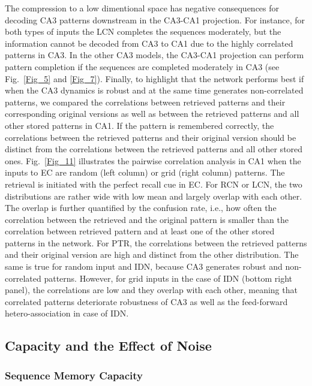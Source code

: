 \documentclass[utf8]{frontiersSCNS} %
\begin{document}
The compression to a low dimentional space has negative consequences for decoding CA3 patterns downstream in the CA3-CA1 projection. For instance, for both types of inputs the LCN completes the sequences moderately, but the information cannot be decoded from CA3 to CA1 due to the highly correlated patterns in CA3. In the other CA3 models, the CA3-CA1 projection can perform pattern completion if the sequences are completed moderately in CA3 (see Fig.~\ref{Fig_5} and \ref{Fig_7}). Finally, to highlight that the network performs best if when the CA3 dynamics is robust and at the same time generates non-correlated patterns, we compared the correlations between retrieved patterns and their corresponding original versions as well as between the retrieved patterns and all other stored patterns in CA1. If the pattern is remembered correctly, the correlations between the retrieved patterns and their original version should be distinct from the correlations between the retrieved patterns and all other stored ones. Fig.~\ref{Fig_11} illustrates the pairwise correlation analysis in CA1 when the inputs to EC are random (left column) or grid (right column) patterns. The retrieval is initiated with the perfect recall cue in EC. For RCN or LCN, the two distributions are rather wide with low mean and largely overlap with each other. The overlap is further quantified by the confusion rate, i.e., how often the correlation between the retrieved and the original pattern is smaller than the correlation between retrieved pattern and at least one of the other stored patterns in the network. For PTR, the correlations between the retrieved patterns and their original version are high and distinct from the other distribution. The same is true for random input and IDN, because CA3 generates robust and non-correlated patterns. However, for grid inputs in the case of IDN (bottom right panel), the correlations are low and they overlap with each other, meaning that correlated patterns deteriorate robustness of CA3 as well as the feed-forward hetero-association in case of IDN.    


\subsection{Capacity and the Effect of Noise}

\subsubsection{Sequence Memory Capacity}
\end{document}
